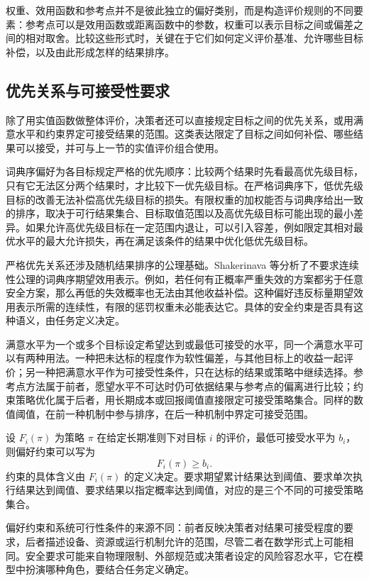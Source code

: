 权重、效用函数和参考点并不是彼此独立的偏好类别，而是构造评价规则的不同要素：参考点可以是效用函数或距离函数中的参数，权重可以表示目标之间或偏差之间的相对取舍。比较这些形式时，关键在于它们如何定义评价基准、允许哪些目标补偿，以及由此形成怎样的结果排序。

\subsection{优先关系与可接受性要求}\label{sec:criteria-priority}

除了用实值函数做整体评价，决策者还可以直接规定目标之间的优先关系，或用满意水平和约束界定可接受结果的范围。这类表达限定了目标之间如何补偿、哪些结果可以接受，并可与上一节的实值评价组合使用。

词典序偏好为各目标规定严格的优先顺序：比较两个结果时先看最高优先级目标，只有它无法区分两个结果时，才比较下一优先级目标。在严格词典序下，低优先级目标的改善无法补偿高优先级目标的损失。有限权重的加权能否与词典序给出一致的排序，取决于可行结果集合、目标取值范围以及高优先级目标可能出现的最小差异。如果允许高优先级目标在一定范围内退让，可以引入容差，例如限定其相对最优水平的最大允许损失，再在满足该条件的结果中优化低优先级目标\cite{skalse2022}。

严格优先关系还涉及随机结果排序的公理基础。Shakerinava 等分析了不要求连续性公理的词典序期望效用表示\cite{shakerinava2025lex}。例如，若任何有正概率严重失效的方案都劣于任意安全方案，那么再低的失效概率也无法由其他收益补偿。这种偏好违反标量期望效用表示所需的连续性，有限的惩罚权重未必能表达它。具体的安全约束是否具有这种语义，由任务定义决定。

满意水平为一个或多个目标设定希望达到或最低可接受的水平，同一个满意水平可以有两种用法。一种把未达标的程度作为软性偏差，与其他目标上的收益一起评价；另一种把满意水平作为可接受性条件，只在达标的结果或策略中继续选择。参考点方法属于前者，愿望水平不可达时仍可依据结果与参考点的偏离进行比较\cite{wierzbicki1982}；约束策略优化属于后者，用长期成本或回报阈值直接限定可接受策略集合\cite{achiam2017}。同样的数值阈值，在前一种机制中参与排序，在后一种机制中界定可接受范围。

设 $F_{i}(\pi)$ 为策略 $\pi$ 在给定长期准则下对目标 $i$ 的评价，最低可接受水平为 $b_i$，则偏好约束可以写为
\begin{equation}
F_{i}(\pi)\geq b_{i}.
\end{equation}
约束的具体含义由 $F_i(\pi)$ 的定义决定。要求期望累计结果达到阈值、要求单次执行结果达到阈值、要求结果以指定概率达到阈值，对应的是三个不同的可接受策略集合。

偏好约束和系统可行性条件的来源不同：前者反映决策者对结果可接受程度的要求，后者描述设备、资源或运行机制允许的范围，尽管二者在数学形式上可能相同。安全要求可能来自物理限制、外部规范或决策者设定的风险容忍水平，它在模型中扮演哪种角色，要结合任务定义确定。

